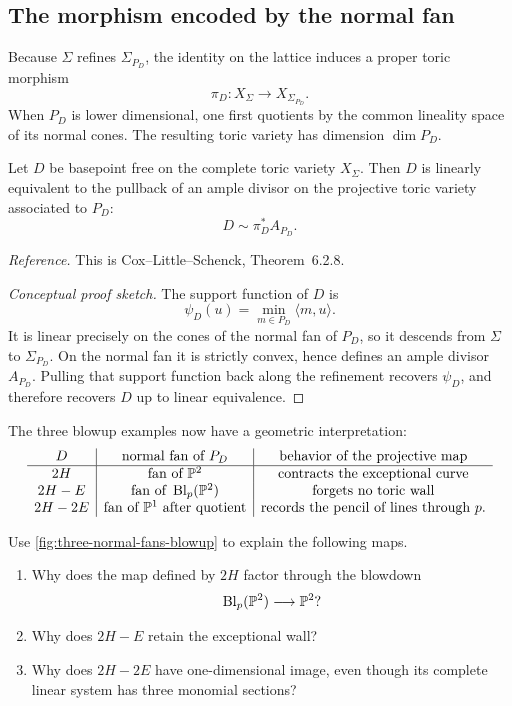 \subsection{The morphism encoded by the normal fan}

Because \(\Sigma\) refines \(\Sigma_{P_D}\), the identity on the
lattice induces a proper toric morphism
\[
\pi_D:X_\Sigma\longrightarrow X_{\Sigma_{P_D}}.
\]
When \(P_D\) is lower dimensional, one first quotients by the common
lineality space of its normal cones. The resulting toric variety has
dimension \(\dim P_D\).

\begin{theorem}
\label{thm:basepoint-free-pullback-ample}
Let \(D\) be basepoint free on the complete toric variety
\(X_\Sigma\). Then \(D\) is linearly equivalent to the pullback of an
ample divisor on the projective toric variety associated to \(P_D\):
\[
D\sim\pi_D^*A_{P_D}.
\]
\end{theorem}

\noindent
\textit{Reference.}
This is Cox--Little--Schenck, Theorem~6.2.8.

\begin{proof}[Conceptual proof sketch]
The support function of \(D\) is
\[
\psi_D(u)
=
\min_{m\in P_D}\langle m,u\rangle.
\]
It is linear precisely on the cones of the normal fan of \(P_D\), so
it descends from \(\Sigma\) to \(\Sigma_{P_D}\). On the normal fan it
is strictly convex, hence defines an ample divisor \(A_{P_D}\). Pulling
that support function back along the refinement recovers
\(\psi_D\), and therefore recovers \(D\) up to linear equivalence.
\end{proof}

The three blowup examples now have a geometric interpretation:
\[
\begin{array}{c|c|c}
D
&
\text{normal fan of }P_D
&
\text{behavior of the projective map}
\\
\hline
2H
&
\text{fan of }\PP^2
&
\text{contracts the exceptional curve}
\\
2H-E
&
\text{fan of }\Blp{\PP^2}{p}
&
\text{forgets no toric wall}
\\
2H-2E
&
\text{fan of }\PP^1\text{ after quotient}
&
\text{records the pencil of lines through }p.
\end{array}
\]

\begin{surfacelaboratory}
Use \cref{fig:three-normal-fans-blowup} to explain the following maps.

\begin{enumerate}[label=(\alph*),wide=0pt]
\item Why does the map defined by \(2H\) factor through the blowdown
\[
\Blp{\PP^2}{p}\longrightarrow\PP^2?
\]

\item Why does \(2H-E\) retain the exceptional wall?

\item Why does \(2H-2E\) have one-dimensional image, even though its
complete linear system has three monomial sections?
\end{enumerate}
\end{surfacelaboratory}

